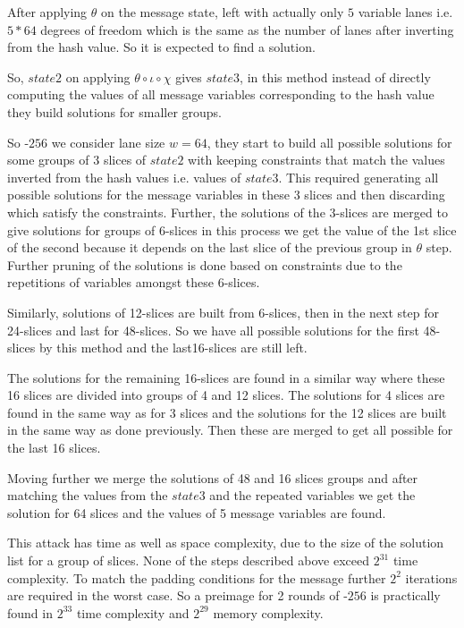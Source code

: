 After applying $\theta$ on the message state, left with actually only $5$ variable lanes i.e. $5*64$ degrees of freedom which is the same as the number of lanes after inverting from the hash value. So it is expected to find a solution.

So, $state2$ on applying $\theta \circ \iota \circ \chi$ gives $state3$, in this method instead of directly computing the values of all message variables corresponding to the hash value they build solutions for smaller groups. 

So \KECCAK-$256$ we consider lane size $w = 64$, they start to build all possible solutions for some groups of 3 slices of $state2$ with keeping constraints that match the values inverted from the hash values i.e. values of $state3$. This required generating all possible solutions for the message variables in these 3 slices and then discarding which satisfy the constraints.
Further, the solutions of the 3-slices are merged to give solutions for groups of 6-slices in this process we get the value of the 1st slice of the second because it depends on the last slice of the previous group in $\theta$ step. Further pruning of the solutions is done based on constraints due to the repetitions of variables amongst these 6-slices.

Similarly, solutions of 12-slices are built from 6-slices, then in the next step for 24-slices and last for 48-slices. 
So we have all possible solutions for the first 48-slices by this method and the last16-slices are still left.

The solutions for the remaining 16-slices are found in a similar way where these 16 slices are divided into groups of 4 and 12 slices. The solutions for 4 slices are found in the same way as for 3 slices and the solutions for the 12 slices are built in the same way as done previously. Then these are merged to get all possible for the last 16 slices.

Moving further we merge the solutions of 48 and 16 slices groups and after matching the values from the $state3$ and the repeated variables we get the solution for 64 slices and the values of 5 message variables are found. 

This attack has time as well as space complexity, due to the size of the solution list for a group of slices. None of the steps described above exceed $2^{31}$ time complexity. To match the padding conditions for the message further $2^2$ iterations are required in the worst case. So a preimage for 2 rounds of \KECCAK-$256$ is practically found in $2^{33}$ time complexity and $2^{29}$ memory complexity.

